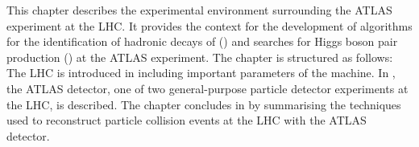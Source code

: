 This chapter describes the experimental environment surrounding the ATLAS
experiment at the LHC. It provides the context for the development of algorithms
for the identification of hadronic decays of \tauleptons () and
searches for Higgs boson pair production
() at the ATLAS experiment. The
chapter is structured as follows: The LHC is introduced in 
including important parameters of the machine. In , the ATLAS
detector, one of two general-purpose particle detector experiments at the LHC,
is described. The chapter concludes in  by
summarising the techniques used to reconstruct particle collision events at the
LHC with the ATLAS detector.

